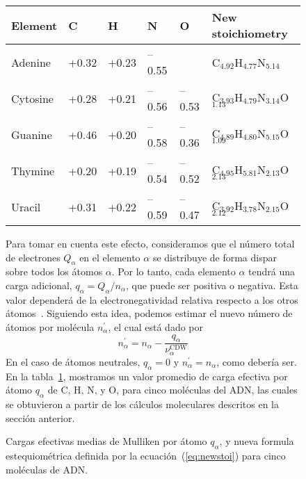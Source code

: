 \begin{figure}
\begin{table*}[t]
\begin{center}
\begin{tabular}{|p{}|p{}|p{}|p{
}|p{}|p{}|}
\hline
Element & C & H & N & O & New stoichiometry \\
\hline
Adenine & +0.32 & +0.23 & --0.55 &       & 
C$_{4.92}$H$_{4.77}$N$_{5.14}$ \\ 
\hline
Cytosine & +0.28 & +0.21 & --0.56 & --0.53 & 
C$_{3.93}$H$_{4.79}$N$_{3.14}$O$_{1.13}$ \\ 
\hline
Guanine & +0.46 & +0.20 & --0.58 & --0.36 & 
C$_{4.89}$H$_{4.80}$N$_{5.15}$O$_{1.09}$ \\ 
\hline
Thymine & +0.20 & +0.19 & --0.54 & --0.52 & 
C$_{4.95}$H$_{5.81}$N$_{2.13}$O$_{2.13}$ \\ 
\hline
Uracil & +0.31 & +0.22 & --0.59 & --0.47 & 
C$_{3.92}$H$_{3.78}$N$_{2.15}$O$_{2.12}$ \\ 
\hline
\end{tabular}
\caption[Cargas efectivas medias de Mulliken por átomo]
{Cargas efectivas medias de Mulliken por átomo $q_{\alpha}$, y nueva formula
estequiométrica definida por la ecuación~(\ref{eq:newstoi}) para cinco
moléculas de ADN.}
\label{tab:newstoi}
\end{center}
\end{table*}

Para tomar en cuenta este efecto, consideramos que el número total de 
electrones $Q_{\alpha }$ en el elemento $\alpha$ se distribuye de forma
dispar sobre todos los átomos $\alpha$. Por lo tanto, cada elemento  
$\alpha$ tendrá una carga adicional, $q_{\alpha}=Q_{\alpha}/n_{\alpha}$, 
que puede ser positiva o negativa. Esta valor dependerá de la 
electronegatividad relativa respecto a los otros átomos~\cite{rappe1991}. 
Siguiendo esta idea, podemos estimar el nuevo número de átomos por 
molécula $n_{\alpha }^{\prime }$, el cual está dado por
\begin{equation}
n_{\alpha }^{\prime }=n_{\alpha }-
\frac{q_{\alpha }}{\nu_{\alpha }^{\text{CDW}}}
\label{eq:newstoi}
\end{equation}
En el caso de átomos neutrales, $q_{\alpha}=0$ y 
$n_{\alpha}^{\prime}=n_{\alpha}$, como debería ser. En la 
tabla~\ref{tab:newstoi}, mostramos un valor promedio de carga efectiva por
átomo $q_{\alpha}$ de C, H, N, y O, para cinco moléculas del ADN,
las cuales se obtuvieron a partir de los cálculos moleculares descritos 
en la sección anterior.


\end{figure}
